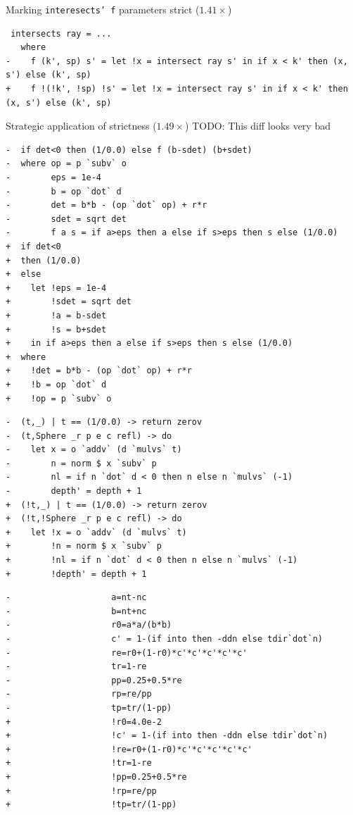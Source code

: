 \documentclass[8pt]{beamer}
\begin{document}
\begin{frame}[fragile]{Marking \texttt{interesects' f} parameters strict ($1.41\times$)}
\begin{verbatim}
 intersects ray = ...
   where
-    f (k', sp) s' = let !x = intersect ray s' in if x < k' then (x, s') else (k', sp)
+    f !(!k', !sp) !s' = let !x = intersect ray s' in if x < k' then (x, s') else (k', sp)
\end{verbatim}
\end{frame}



\begin{frame}[fragile]{Strategic application of strictness ($1.49\times$)}
TODO: This diff looks very bad
\begin{verbatim}
-  if det<0 then (1/0.0) else f (b-sdet) (b+sdet)
-  where op = p `subv` o
-        eps = 1e-4
-        b = op `dot` d
-        det = b*b - (op `dot` op) + r*r
-        sdet = sqrt det
-        f a s = if a>eps then a else if s>eps then s else (1/0.0)
+  if det<0
+  then (1/0.0)
+  else
+    let !eps = 1e-4
+        !sdet = sqrt det
+        !a = b-sdet
+        !s = b+sdet
+    in if a>eps then a else if s>eps then s else (1/0.0)
+  where
+    !det = b*b - (op `dot` op) + r*r
+    !b = op `dot` d
+    !op = p `subv` o
\end{verbatim}


\begin{verbatim}
-  (t,_) | t == (1/0.0) -> return zerov
-  (t,Sphere _r p e c refl) -> do
-    let x = o `addv` (d `mulvs` t)
-        n = norm $ x `subv` p
-        nl = if n `dot` d < 0 then n else n `mulvs` (-1)
-        depth' = depth + 1
+  (!t,_) | t == (1/0.0) -> return zerov
+  (!t,!Sphere _r p e c refl) -> do
+    let !x = o `addv` (d `mulvs` t)
+        !n = norm $ x `subv` p
+        !nl = if n `dot` d < 0 then n else n `mulvs` (-1)
+        !depth' = depth + 1
\end{verbatim}
\begin{verbatim}
-                    a=nt-nc
-                    b=nt+nc
-                    r0=a*a/(b*b)
-                    c' = 1-(if into then -ddn else tdir`dot`n)
-                    re=r0+(1-r0)*c'*c'*c'*c'*c'
-                    tr=1-re
-                    pp=0.25+0.5*re
-                    rp=re/pp
-                    tp=tr/(1-pp)
+                    !r0=4.0e-2
+                    !c' = 1-(if into then -ddn else tdir`dot`n)
+                    !re=r0+(1-r0)*c'*c'*c'*c'*c'
+                    !tr=1-re
+                    !pp=0.25+0.5*re
+                    !rp=re/pp
+                    !tp=tr/(1-pp)
\end{verbatim}
\end{frame}
\end{document}
